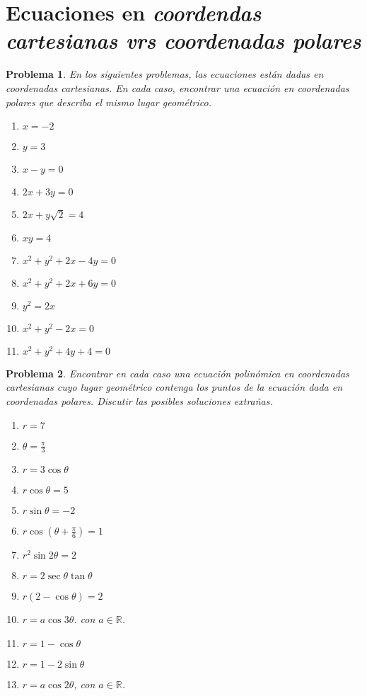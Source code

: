 \documentclass[letterpaper,12pt]{article}
\newtheorem{prob}{Problema}
\begin{document}
\section{Ecuaciones en \textit{coordendas cartesianas vrs coordenadas polares}}
\begin{prob}
En los siguientes problemas, las ecuaciones están dadas en coordenadas cartesianas. En cada caso, encontrar una ecuación en coordenadas polares que describa el mismo lugar geométrico.
\begin{multicols}{3}
\begin{enumerate}[label=\alph*)]
    \item $x=-2$
    \item $y=3$
    \item $x-y=0$
    \item $2x+3y=0$
    \item $2x+y\sqrt{2}=4$
    \item $xy=4$
    \item $x^2+y^2+2x-4y=0$
    \item $x^2+y^2+2x+6y=0$
    \item $y^2=2x$
    \item $x^2+y^2-2x=0$
    \item $x^2+y^2+4y+4=0$
\end{enumerate}
\end{multicols}
\end{prob}
\newpage
\begin{prob}
Encontrar en cada caso una ecuación polinómica en coordenadas cartesianas cuyo lugar geométrico contenga los puntos de la ecuación dada en coordenadas polares. Discutir las posibles soluciones extrañas.
\begin{multicols}{3}
\begin{enumerate}[label=\alph*)]
    \item $r=7$
    \item $\displaystyle \theta=\frac{\pi}{3}$
    \item $r=3\cos{\theta}$
    \item $r\cos{\theta}=5$
    \item $r\sin{\theta}=-2$
    \item $\displaystyle r\cos\left(\theta+\frac{\pi}{6}\right)=1$
    \item $r^2\sin{2\theta}=2$
    \item $r=2\sec{\theta}\tan{\theta}$
    \item $r(2-\cos{\theta})=2$
    \item $r=a\cos{3\theta}$. con $a\in \mathbb{R}$.
    \item $r=1-\cos{\theta}$
    \item $r=1-2\sin{\theta}$
    \item $r=a\cos{2\theta}$, con $a\in \mathbb{R}$.
\end{enumerate}
\end{multicols}
\end{prob}
\end{document}
